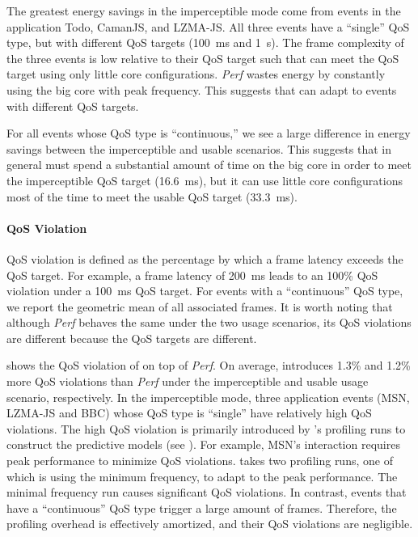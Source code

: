 The greatest energy savings in the imperceptible mode come from events in the application \textsf{Todo}, \textsf{CamanJS}, and \textsf{LZMA-JS}. All three events have a ``single'' QoS type, but with different QoS targets (100~ms and 1~s). The frame complexity of the three events is low relative to their QoS target such that \greenweb can meet the QoS target using only little core configurations. \textit{Perf} wastes energy by constantly using the big core with peak frequency. This suggests that \greenweb can adapt to events with different QoS targets.

For all events whose QoS type is ``continuous,'' we see a large difference in energy savings between the imperceptible and usable scenarios. This suggests that in general \greenweb must spend a substantial amount of time on the big core in order to meet the imperceptible QoS target (16.6~ms), but it can use little core configurations most of the time to meet the usable QoS target (33.3~ms). 

\paragraph{QoS Violation} QoS violation is defined as the percentage by which a frame latency exceeds the QoS target. For example, a frame latency of 200~ms leads to an 100\% QoS violation under a 100~ms QoS target. For events with a ``continuous'' QoS type, we report the geometric mean of all associated frames. It is worth noting that although \textit{Perf} behaves the same under the two usage scenarios, its QoS violations are different because the QoS targets are different.

 shows the QoS violation of \greenweb on top of \textit{Perf}. On average, \greenweb introduces 1.3\% and 1.2\% more QoS violations than \textit{Perf} under the imperceptible and usable usage scenario, respectively. In the imperceptible mode, three application events (\textsf{MSN}, \textsf{LZMA-JS} and \textsf{BBC}) whose QoS type is ``single'' have relatively high QoS violations. The high QoS violation is primarily introduced by \greenweb's profiling runs to construct the predictive models (see ). For example, \textsf{MSN}'s interaction requires peak performance to minimize QoS violations. \greenweb takes two profiling runs, one of which is using the minimum frequency, to adapt to the peak performance. The minimal frequency run causes significant QoS violations. In contrast, events that have a ``continuous'' QoS type trigger a large amount of frames. Therefore, the profiling overhead is effectively amortized, and their QoS violations are negligible.

